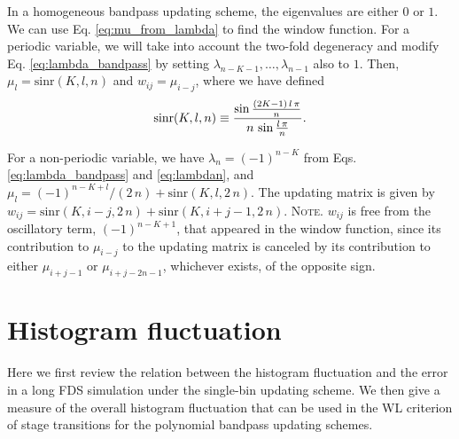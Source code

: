 \documentclass[reprint, superscriptaddress, floatfix]{revtex4-1}
\newcommand{\note}[1]{{\color{DarkGreen}\footnotesize \textsc{Note.} #1}}
\begin{document}
In a homogeneous bandpass updating scheme,
the eigenvalues are either $0$ or $1$.
%
We can use Eq. \eqref{eq:mu_from_lambda}
to find the window function.
%
For a periodic variable,
we will take into account the two-fold degeneracy
and modify Eq. \eqref{eq:lambda_bandpass}
by setting $\lambda_{n-K-1}, \dots, \lambda_{n-1}$
also to $1$.
%
Then, $\mu_l = \mathrm{sinr}(K, l, n)$ and $w_{ij} = \mu_{i-j}$,
where we have defined
\begin{equation}
  \mathrm{sinr}(K, l, n)
  \equiv
  \frac{
    \sin
    \frac{ (2 K - 1) \, l \, \pi }
         {              n        }
  }
  {
    n \, \sin \frac{ l \, \pi } { n }
  }
  .
\notag
\end{equation}
%

For a non-periodic variable,
we have $\lambda_n = (-1)^{n-K}$
from Eqs. \eqref{eq:lambda_bandpass} and \eqref{eq:lambdan},
and $\mu_l = (-1)^{n-K+l}/(2 \, n) + \mathrm{sinr}(K, l, 2 \, n)$.
%
The updating matrix is given by
$w_{ij} = \mathrm{sinr}(K, i-j, 2 \, n) + \mathrm{sinr}(K, i+j-1, 2 \, n)$.
%
\note{$w_{ij}$
  is free from the oscillatory term, $(-1)^{n-K+1}$,
  that appeared in the window function, since
  its contribution to $\mu_{i-j}$ to the updating matrix
  is canceled by its contribution to either $\mu_{i+j-1}$
  or $\mu_{i+j-2n-1}$,
  whichever exists, of the opposite sign.}
%



\section{\label{sec:hfluc}
Histogram fluctuation}


Here we first review the relation
between the histogram fluctuation and the error
in a long FDS simulation under the single-bin updating scheme.
%
We then give a measure of the overall histogram fluctuation
that can be used in the WL criterion of stage transitions
for the polynomial bandpass updating schemes.

\end{document}
